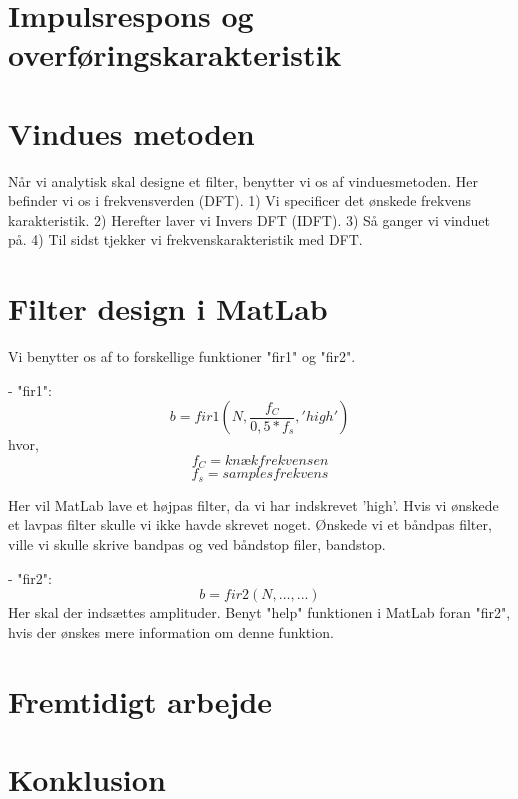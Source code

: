 \documentclass[12pt, letterpaper]{article}
\begin{document}
\section{Impulsrespons og overføringskarakteristik}


\section{Vindues metoden}
Når vi analytisk skal designe et filter, benytter vi os af vinduesmetoden. Her befinder vi os i frekvensverden (DFT). 
1) Vi specificer det ønskede frekvens karakteristik.
2) Herefter laver vi Invers DFT (IDFT). 
3) Så ganger vi vinduet på. 
4) Til sidst tjekker vi frekvenskarakteristik med DFT. 
 
\section{Filter design i MatLab}
Vi benytter os af to forskellige funktioner "fir1" og "fir2". 

- "fir1": 
$$ b = fir1(N, \frac{f_C}{0,5*f_s}, 'high') $$ 
hvor, 
$$ f_C = knækfrekvensen $$
$$ f_s = samplesfrekvens $$

Her vil MatLab lave et højpas filter, da vi har indskrevet 'high'. 
Hvis vi ønskede et lavpas filter skulle vi ikke havde skrevet noget. Ønskede vi et båndpas filter, ville vi skulle skrive bandpas og ved båndstop filer, bandstop. 

- "fir2": 
$$ b = fir2(N, ..., ...) $$
Her skal der indsættes amplituder. Benyt "help" funktionen i MatLab foran "fir2", hvis der ønskes mere information om denne funktion. 

\section{Fremtidigt arbejde}
 
\section{Konklusion}
\end{document}
